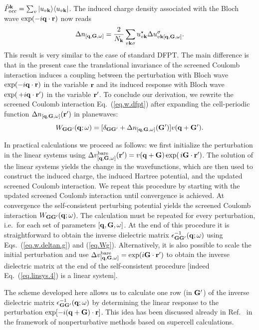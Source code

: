 \documentclass[twocolumn,prb,showpacs,superscriptaddress]{revtex4}
\def\w{\omega}
\def\P{\hat{P}_{\rm occ}}
\def\q{{\bf q}}
\def\s{\sigma}
\def\k{{\bf k}}
\def\G{{\bf G}}
\def\Gp{{\bf G^\prime}}
\def\r{{\bf r}}
\def\rp{{\bf r^\prime}}
\begin{document}
$\P^\k=\sum_v | u_{v\k} \rangle \langle u_{v\k}|$.
The induced charge density associated with the Bloch wave ${\rm exp}(-i\q\cdot\r)$ 
now reads 
  \begin{equation} \label{eq.deltan.bloch}
  \Delta n_{[\q,\G,\w]} = \frac{2}{N_\k}\sum_{v\k\s} u_{v\k}^\star  \Delta u^\s_{v\k[\q,\G,\w]}.
  \end{equation}
This result is very similar to the case of standard DFPT.\cite{baroni.rmp} 
The main difference is that in the present case the translational invariance 
of the screened Coulomb interaction induces a coupling between the perturbation 
with Bloch wave ${\rm exp}(-i\q\cdot\r)$ in the variable $\r$ and its induced
response with Bloch wave ${\rm exp}(\,+i\q\cdot\rp)$ in the variable $\rp$.
To conclude our derivation, we rewrite the screened Coulomb interaction 
Eq.\ (\ref{eq.w.dfpt}) after expanding the cell-periodic function 
$\Delta n_{[\q,\G,\w]}(\rp)$ in planewaves:
  \begin{equation}\label{eq.w.deltan.g}
  W_{\G\Gp}(\q;\w) = [\delta_{\G\Gp} + \Delta n_{[\q,\G,\w]}(\Gp) ]v(\q+\Gp).
  \end{equation}

In practical calculations we proceed as follows: we first initialize the perturbation
in the linear systems using 
$\Delta v^{\rm bare}_{[\q,\G,\w]}(\rp) = v(\q+\G) \, {\rm exp}(\,i\G\cdot\rp)$.
The solution of the linear systems yields the change in the wavefunctions,
which are then used to construct the induced charge, the induced Hartree potential,
and the updated screened Coulomb interaction. We repeat this procedure by starting with
the updated screened Coulomb interaction until convergence is achieved.
At convergence the self-consistent perturbing potential yields
the screened Coulomb interaction $W_{\G\Gp}(\q;\w)$.
The calculation must be repeated for every perturbation, i.e.\ for
each set of parameters $[\q,\G,\w]$.
At the end of this procedure it is straightforward to obtain the inverse dielectric matrix 
$\epsilon^{-1}_{\G\Gp}(\q;\w)$ using Eqs.~(\ref{eq.w.deltan.g}) and 
(\ref{eq.Wg}). Alternatively, it is also possible to scale the initial
perturbation and use $\Delta v^{\rm bare}_{[\q,\G,\w]} = {\rm exp}(i\G\cdot\rp)$
to obtain the inverse dielectric matrix at the end of the self-consistent procedure
[indeed Eq.~(\ref{eq.linsys.4}) is a linear system].

The scheme developed here allows us to calculate one row (in $\Gp$) of the inverse 
dielectric matrix $\epsilon^{-1}_{\G\Gp}(\q;\w)$ by determining the linear response to the
perturbation ${\rm exp}[-i(\q+\G)\cdot\r]$. This idea has been discussed already
in Ref.\  in the framework of nonperturbative methods
based on supercell calculations.
\end{document}
